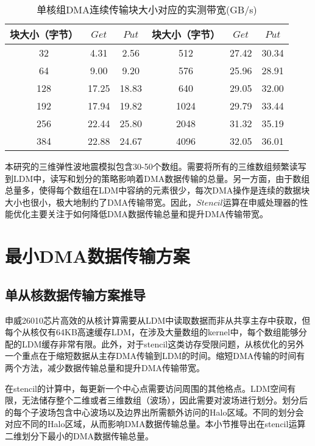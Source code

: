 \begin{table*}[thb]
\caption{单核组DMA连续传输块大小对应的实测带宽(GB/s)}
\label{tb:sw-bw}
\centering
\begin{tabular}{|c|c|c||c|c|c|}
  \hline
  块大小（字节） & $Get$ & $Put$ & 块大小（字节） & $Get$ & $Put$ \\
  \hline
  32&4.31&2.56& 512&27.42&30.34\\
  \hline
  64&9.00&9.20& 576&25.96&28.91\\
  \hline
  128&17.25&18.83& 640&29.05&32.00\\
  \hline
  192&17.94&19.82& 1024&29.79&33.44\\
  \hline
  256&22.44&25.80& 2048&31.32&35.19\\
  \hline
  384&22.88&24.67& 4096&32.05&36.01\\
  \hline
\end{tabular}
\end{table*}

本研究的三维弹性波地震模拟包含30-50个数组。需要将所有的三维数组频繁读写到LDM中，读写和划分的策略影响着DMA数据传输的总量。另一方面，由于数组总量多，使得每个数组在LDM中容纳的元素很少，每次DMA操作是连续的数据块大小也很小，极大地制约了DMA传输带宽。因此，$Stencil$运算在申威处理器的性能优化主要关注于如何降低DMA数据传输总量和提升DMA传输带宽。

\section{最小DMA数据传输方案} %
\label{sec:最小DMA数据传输方案}

\subsection{单从核数据传输方案推导}

申威26010芯片高效的从核计算需要从LDM中读取数据而非从共享主存中获取，但每个从核仅有64KB高速缓存LDM，在涉及大量数组的kernel中，每个数组能够分配的LDM缓存非常有限。此外，对于stencil这类访存受限问题，从核优化的另外一个重点在于缩短数据从主存DMA传输到LDM的时间。缩短DMA传输的时间有两个方法，减少数据传输总量和提升DMA传输带宽。

在stencil的计算中，每更新一个中心点需要访问周围的其他格点。LDM空间有限，无法储存整个二维或者三维数组（波场），因此需要对波场进行划分。划分后的每个子波场包含中心波场以及边界出所需额外访问的Halo区域。不同的划分会对应不同的Halo区域，从而影响DMA数据传输总量。本小节推导出在stencil运算二维划分下最小的DMA数据传输总量。

